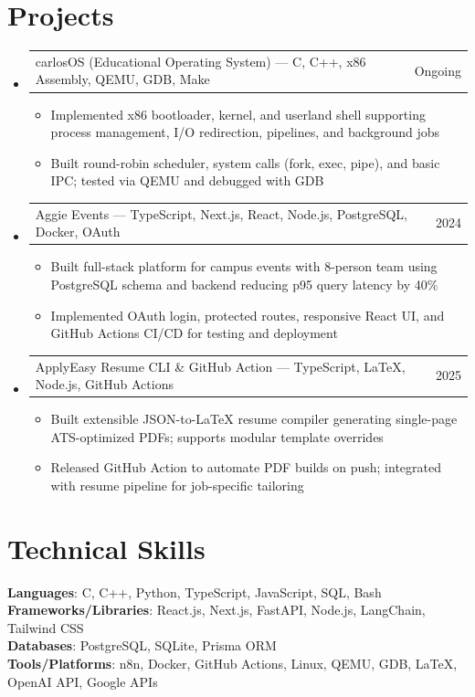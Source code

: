 \documentclass[letterpaper,11pt]{article}
\makeatletter
\newcommand{\resumeItem}[1]{
  \item\small{{#1 \vspace{-2pt}}}
}
\newcommand{\resumeProjectHeading}[2]{
    \item
    \begin{tabular*}{0.97\textwidth}{l@{\extracolsep{\fill}}r}
      \small#1 & #2 \\
    \end{tabular*}\vspace{-7pt}
}
\newcommand{\resumeSubHeadingListStart}{\begin{itemize}[leftmargin=0.15in, label={}]}
\newcommand{\resumeSubHeadingListEnd}{\end{itemize}}
\newcommand{\resumeItemListStart}{\begin{itemize}}
\newcommand{\resumeItemListEnd}{\end{itemize}\vspace{-5pt}}
\makeatother
\begin{document}
\section{Projects}
\resumeSubHeadingListStart
  \resumeProjectHeading
    {carlosOS (Educational Operating System) — C, C++, x86 Assembly, QEMU, GDB, Make}{Ongoing}
    \resumeItemListStart
      \resumeItem{Implemented x86 bootloader, kernel, and userland shell supporting process management, I/O redirection, pipelines, and background jobs}
      \resumeItem{Built round-robin scheduler, system calls (fork, exec, pipe), and basic IPC; tested via QEMU and debugged with GDB}
    \resumeItemListEnd

  \resumeProjectHeading
    {Aggie Events — TypeScript, Next.js, React, Node.js, PostgreSQL, Docker, OAuth}{2024}
    \resumeItemListStart
      \resumeItem{Built full-stack platform for campus events with 8-person team using PostgreSQL schema and backend reducing p95 query latency by 40\%}
      \resumeItem{Implemented OAuth login, protected routes, responsive React UI, and GitHub Actions CI/CD for testing and deployment}
    \resumeItemListEnd

  \resumeProjectHeading
    {ApplyEasy Resume CLI \& GitHub Action — TypeScript, LaTeX, Node.js, GitHub Actions}{2025}
    \resumeItemListStart
      \resumeItem{Built extensible JSON-to-LaTeX resume compiler generating single-page ATS-optimized PDFs; supports modular template overrides}
      \resumeItem{Released GitHub Action to automate PDF builds on push; integrated with resume pipeline for job-specific tailoring}
    \resumeItemListEnd
\resumeSubHeadingListEnd

\section{Technical Skills}
\begin{itemize}[leftmargin=0.15in, label={}]
  \small{\item{
    \textbf{Languages}{: C, C++, Python, TypeScript, JavaScript, SQL, Bash} \\
    \textbf{Frameworks/Libraries}{: React.js, Next.js, FastAPI, Node.js, LangChain, Tailwind CSS} \\
    \textbf{Databases}{: PostgreSQL, SQLite, Prisma ORM} \\
    \textbf{Tools/Platforms}{: n8n, Docker, GitHub Actions, Linux, QEMU, GDB, LaTeX, OpenAI API, Google APIs}
  }}
\end{itemize}
\end{document}

